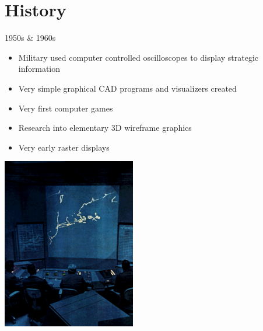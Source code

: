 \documentclass{lug}
\begin{document}
\section{History}

\begin{frame}{1950s \& 1960s}
    \noindent
    \begin{minipage}{.65\textwidth - 2em}
        \small
        \begin{itemize}
            \item Military used computer controlled oscilloscopes to display strategic information
            \item Very simple graphical CAD programs and visualizers created
            \item Very first computer games
            \item Research into elementary 3D wireframe graphics
            \item Very early raster displays
        \end{itemize}
    \end{minipage}%
    \hspace{1.5em}%
    \begin{minipage}{.35\textwidth}
        \includegraphics[width=\textwidth]{graphics/sage_control} \\

\end{minipage}
\end{frame}
\end{document}
